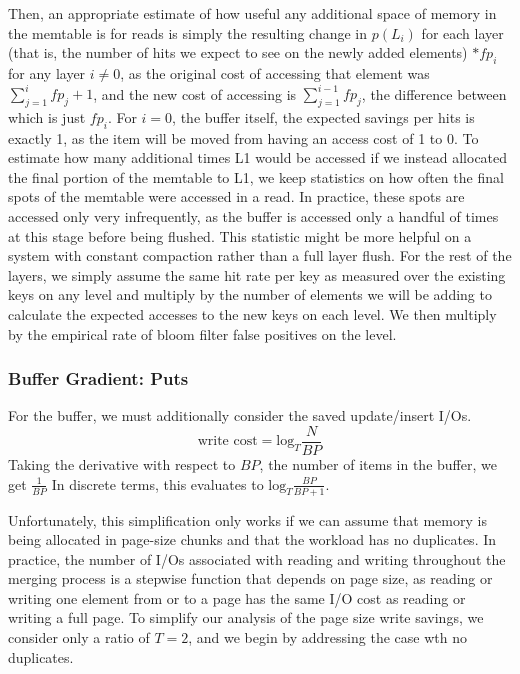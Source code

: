\documentclass{sig-alternate-05-2015}
\begin{document}
Then, an appropriate estimate of how useful any additional space of memory in
the memtable is for reads is simply the resulting change in $p(L_i)$ for each layer (that is, the number of hits
we expect to see on the newly added elements) $* fp_{i}$ for any layer $i\neq0$, as the original cost of accessing that element was $\sum_{j=1}^i fp_{j} + 1$, and the new cost of accessing is $\sum_{j=1}^{i-1} fp_{j} $, the difference between which is just $fp_{i}$. For $i=0$, the buffer itself, the expected savings per hits is exactly 1, as the item will be moved from having an access cost of 1 to 0. To estimate how many additional times L1 would be accessed if
we instead allocated the final portion of the memtable to L1, we keep
statistics on how often the final spots of the memtable were accessed in a
read. In practice, these spots are accessed only very infrequently, as the
buffer is accessed only a handful of times at this stage before being flushed.
This statistic might be more helpful on a system with constant compaction
rather than a full layer flush. For the rest of the layers, we simply assume the same hit rate per key
as measured over the existing keys on any level and multiply by the number of elements we will be adding to calculate
the expected accesses to the new keys on each level. We then multiply by the empirical rate of bloom filter false positives on the level.

\subsubsection{Buffer Gradient: Puts}

For the buffer, we must additionally consider the saved update/insert I/Os.  $$
\text{write cost} = \textrm{log}_{T} \frac{N}{BP} $$ Taking the derivative with
respect to $BP$, the number of items in the buffer, we get $\frac{1}{BP}$ In
discrete terms, this evaluates to $\textrm{log}_{T} \frac{BP}{BP+1}$. 

Unfortunately, this simplification only works if we can assume that memory is being allocated in 
page-size chunks and that the workload has no duplicates. In practice, the number of I/Os associated
with reading and writing throughout the merging process is a stepwise function that depends on page size, as reading or
writing one element from or to a page has the same I/O cost as reading or writing a full page. To simplify our analysis
of the page size write savings, we consider only a ratio of $T=2$, and we begin by addressing the case wth no 
duplicates. 
\end{document}
